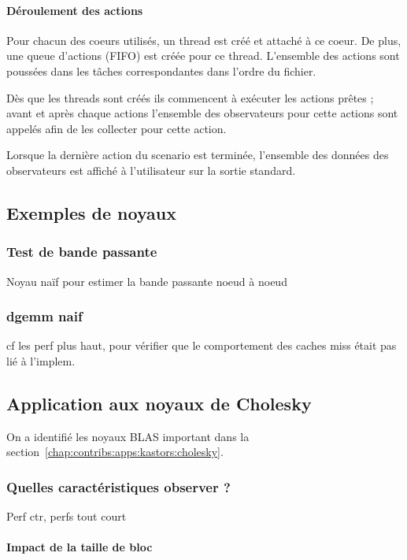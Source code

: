 \paragraph{Déroulement des actions}
Pour chacun des coeurs utilisés, un thread est créé et attaché à ce coeur. De plus, une queue d'actions (FIFO) est créée pour ce thread.
L'ensemble des actions sont poussées dans les tâches correspondantes dans l'ordre du fichier.

Dès que les threads sont créés ils commencent à exécuter les actions prêtes ; avant et après chaque actions l'ensemble des observateurs pour cette actions sont appelés afin de les collecter pour cette action.

Lorsque la dernière action du scenario est terminée, l'ensemble des données des observateurs est affiché à l'utilisateur sur la sortie standard.

\subsection{Exemples de noyaux}

\subsubsection{Test de bande passante}

Noyau naïf pour estimer la bande passante noeud à noeud

\subsubsection{dgemm naif}

cf les perf plus haut, pour vérifier que le comportement des caches miss était pas lié à l'implem.


\subsection{Application aux noyaux de Cholesky}

On a identifié les noyaux BLAS important dans la section~\ref{chap:contribs:apps:kastors:cholesky}.

\subsubsection{Quelles caractéristiques observer ?}
Perf ctr, perfs tout court

\paragraph{Impact de la taille de bloc}

